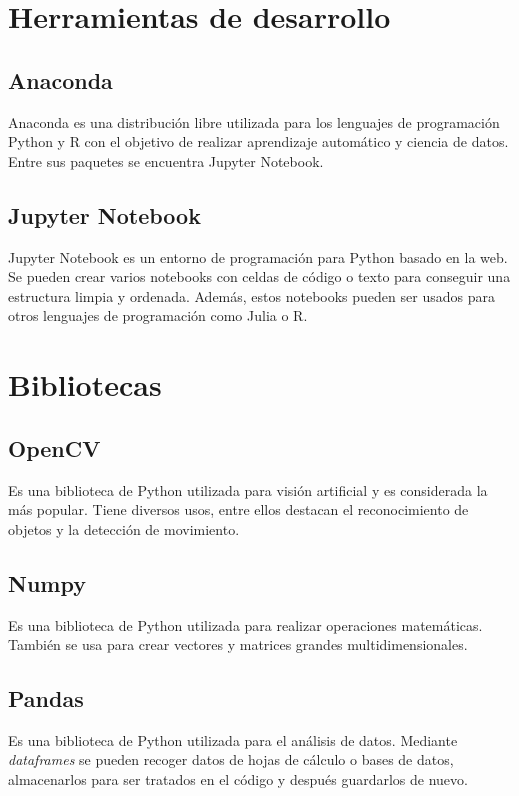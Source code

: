 \section{Herramientas de desarrollo}
\subsection{Anaconda}
Anaconda es una distribución libre utilizada para los lenguajes de programación Python y R con el objetivo de realizar aprendizaje automático y ciencia de datos. Entre sus paquetes se encuentra Jupyter Notebook.

\subsection{Jupyter Notebook}
Jupyter Notebook es un entorno de programación para Python basado en la web. Se pueden crear varios notebooks con celdas de código o texto para conseguir una estructura limpia y ordenada. Además, estos notebooks pueden ser usados para otros lenguajes de programación como Julia o R.

\section{Bibliotecas}
\subsection{OpenCV}
Es una biblioteca de Python utilizada para visión artificial y es considerada la más popular. Tiene diversos usos, entre ellos destacan el reconocimiento de objetos y la detección de movimiento.\cite{wiki:opencv}

\subsection{Numpy}
Es una biblioteca de Python utilizada para realizar operaciones matemáticas. También se usa para crear vectores y matrices grandes multidimensionales.\cite{wiki:numpy}

\subsection{Pandas}
Es una biblioteca de Python utilizada para el análisis de datos. Mediante \textit{dataframes} se pueden recoger datos de hojas de cálculo o bases de datos, almacenarlos para ser tratados en el código y después guardarlos de nuevo.\cite{wiki:pandas}

